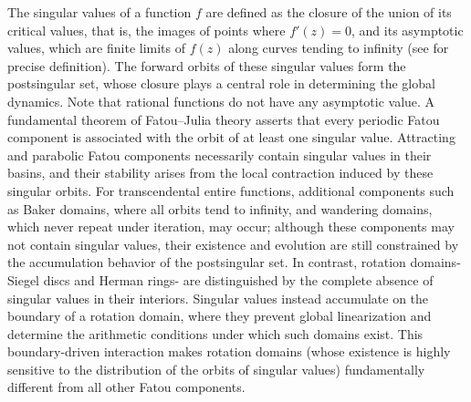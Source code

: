 \documentclass[12pt]{article}
\begin{document}
The singular values of a function $f$ are defined as the closure of the union of its critical values, that is, the images of points where $f'(z)=0$, and its asymptotic values, which are finite limits of $f(z)$ along curves tending to infinity (see \cite{berg93} for precise definition). The forward orbits of these singular values form the postsingular set, whose closure plays a central role in determining the global dynamics. Note that rational functions do not have any asymptotic value. A fundamental theorem of Fatou--Julia theory asserts that every periodic Fatou component is associated with the orbit of at least one singular value. Attracting and parabolic Fatou components necessarily contain singular values in their basins, and their stability arises from the local contraction induced by these singular orbits. 
For transcendental entire functions, additional components such as Baker domains, where all orbits tend to infinity, and wandering domains, which never repeat under iteration, may occur; although these components may not contain singular values, their existence and evolution are still constrained by the accumulation behavior of the postsingular set. 
In contrast, rotation domains-Siegel discs and Herman rings- are distinguished by the complete absence of singular values in their interiors. 
Singular values instead accumulate on the boundary of a rotation domain, where they prevent global linearization and determine the arithmetic conditions under which such domains exist. 
This boundary-driven interaction makes rotation domains (whose existence is highly sensitive to the distribution of the orbits of singular values) fundamentally different from all other Fatou components.
\end{document}
